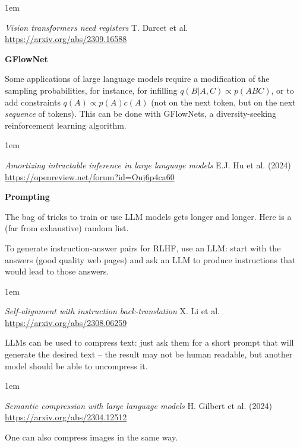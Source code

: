 \documentclass[a5paper]{article}
\newenvironment{reference}{%
  \medskip\goodbreak
  \parskip 0pt
  \raggedright
  \leftskip 1em
  \obeylines
}{\par\medskip\goodbreak}
\def\subsection#1{{\par\bigskip\goodbreak\large\bfseries #1\par}}
\begin{document}
\begin{reference}
  \emph{Vision transformers need registers}
  T. Darcet et al.
  \url{https://arxiv.org/abs/2309.16588}
\end{reference}

\subsection{GFlowNet}

Some applications of large language models require a modification
of the sampling probabilities, for instance, for infilling $q(B|A,C) \propto p(ABC)$,
or to add constraints $q(A) \propto p(A) c(A)$
(not on the next token, but on the next \emph{sequence} of tokens).
This can be done with GFlowNets,
a diversity-seeking reinforcement learning algorithm.

\begin{reference}
  \emph{Amortizing intractable inference in large language models}
  E.J. Hu et al. (2024)
  \url{https://openreview.net/forum?id=Ouj6p4ca60}
\end{reference}

\subsection{Prompting}

The bag of tricks to train or use LLM models gets longer and longer.
Here is a (far from exhaustive) random list.

To generate instruction-answer pairs for RLHF,
use an LLM: start with the answers (good quality web pages)
and ask an LLM to produce instructions that would lead to those answers.

\begin{reference}
  \emph{Self-alignment with instruction back-translation}
  X. Li et al.
  \url{https://arxiv.org/abs/2308.06259}
\end{reference}

LLMs can be used to compress text:
just ask them for a short prompt that will generate the desired text --
the result may not be human readable,
but another model should be able to uncompress it.

\begin{reference}
  \emph{Semantic compression with large language models}
  H. Gilbert et al. (2024)
  \url{https://arxiv.org/abs/2304.12512}
\end{reference}

One can also compress images in the same way.  
\end{document}
